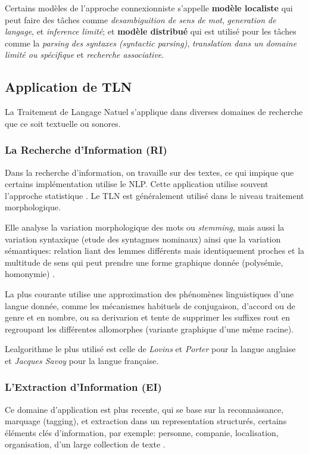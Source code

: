 Certains modèles de l'approche connexionniste s'appelle \textbf{modèle localiste} qui peut faire des tâches comme \emph{desambiguition de sens de mot}, \emph{generation de langage}, et \emph{inference limité}; et \textbf{modèle distribué} qui est utilisé pour les tâches comme la \emph{parsing des syntaxes (syntactic parsing)}, \emph{translation dans un domaine limité ou spécifique} et \emph{recherche associative}.

\subsection{Application de TLN}
La Traitement de Langage Natuel s'applique dans diverses domaines de recherche que ce soit textuelle ou sonores.

\subsubsection*{La Recherche d'Information (RI)}
Dans la recherche d'information, on travaille sur des textes, ce qui impique que certains implémentation utilise le NLP. Cette application utilise souvent l'approche statistique \citep{natural-language-processing}. Le TLN est généralement utilisé dans le niveau traitement morphologique.

Elle analyse la variation morphologique des mots ou \emph{stemming}, mais aussi la variation syntaxique (etude des syntagmes nominaux) ainsi que la variation sémantiques: relation liant des lemmes différents mais identiquement proches et la multitude de sens qui peut prendre une forme graphique donnée (polysémie, homonymie) \citep{automatic-nlp}.

\citep{automatic-nlp} La plus courante utilise une approximation des phénomènes linguistiques d'une langue donnée, comme les mécanismes habituels de conjugaison, d'accord ou de genre et en nombre, ou sa derivarion et tente de supprimer les suffixes rout en regroupant les différentes allomorphes (variante graphique d'une même racine).

Lealgorithme le plus utilisé est celle de \emph{Lovins} et \emph{Porter} pour la langue anglaise et \emph{Jacques Savoy} pour la langue française.

\subsubsection*{L'Extraction d'Information (EI)}
Ce domaine d'application est plus recente, qui se base sur la reconnaissance, marquage (tagging), et extraction dans un representation structurés, certains éléments clés d'information, par exemple: personne, companie, localisation, organisation, d'un large collection de texte \citep{automatic-nlp}.


